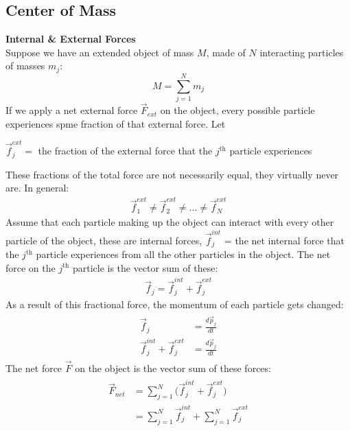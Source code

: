 \documentclass[a4paper]{article}
\let\bf\textbf
\begin{document}
\subsection{Center of Mass}
\bf{Internal \& External Forces}
\vspace{2mm}\\
Suppose we have an extended object of mass $M$, made of $N$ interacting particles of masses $m_j$:
\begin{equation}
    M = \sum_{j = 1}^{N}m_j
\end{equation}
If we apply a net external force $\vec{F}_{ext}$ on the object, every possible particle experiences spme fraction of that external force. Let
\begin{center}
    $\vec{f}^{ext}_j =$ the fraction of the external force that the $j^{\text{th}}$ particle experiences
\end{center}
These fractions of the total force are not necessarily equal, they virtually never are. In general:
\begin{align*}
    \vec{f}^{ext}_1 \neq \vec{f}^{ext}_2 \neq ... \neq \vec{f}^{ext}_N
\end{align*}
Assume that each particle making up the object can interact with every other particle of the object, these are internal forces, $\vec{f}^{int}_j$ = the net internal force that the $j^{\text{th}}$ particle experiences from all the other particles in the object. The net force on the $j^{\text{th}}$ particle is the vector sum of these:
\begin{align}
    \vec{f}_j = \vec{f}^{int}_j + \vec{f}^{ext}_j
\end{align}
As a result of this fractional force, the momentum of each particle gets changed:
\begin{align}
    \begin{split}
        \vec{f}_j &= \frac{d\vec{p}_j}{dt}\\
        \vec{f}^{int}_j + \vec{f}^{ext}_j &= \frac{d\vec{p}_j}{dt}
    \end{split}
\end{align}
The net force $\vec{F}$ on the object is the vector sum of these forces:
\begin{align}
    \begin{split}
        \vec{F}_{net} &= \sum_{j = 1}^{N}\bigg(\vec{f}^{int}_j + \vec{f}^{ext}_j\bigg)\\
        &= \sum_{j = 1}^{N}\vec{f}^{int}_j + \sum_{j = 1}^{N}\vec{f}^{ext}_j
    \end{split}
\end{align}
\end{document}
